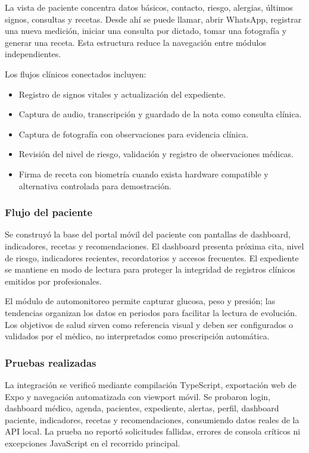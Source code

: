 \documentclass[12pt,letterpaper]{report}
\begin{document}
La vista de paciente concentra datos básicos, contacto, riesgo, alergias, últimos signos, consultas y recetas. Desde ahí se puede llamar, abrir WhatsApp, registrar una nueva medición, iniciar una consulta por dictado, tomar una fotografía y generar una receta. Esta estructura reduce la navegación entre módulos independientes.

Los flujos clínicos conectados incluyen:

\begin{itemize}
  \item Registro de signos vitales y actualización del expediente.
  \item Captura de audio, transcripción y guardado de la nota como consulta clínica.
  \item Captura de fotografía con observaciones para evidencia clínica.
  \item Revisión del nivel de riesgo, validación y registro de observaciones médicas.
  \item Firma de receta con biometría cuando exista hardware compatible y alternativa controlada para demostración.
\end{itemize}

\subsubsection{Flujo del paciente}

Se construyó la base del portal móvil del paciente con pantallas de dashboard, indicadores, recetas y recomendaciones. El dashboard presenta próxima cita, nivel de riesgo, indicadores recientes, recordatorios y accesos frecuentes. El expediente se mantiene en modo de lectura para proteger la integridad de registros clínicos emitidos por profesionales.

El módulo de automonitoreo permite capturar glucosa, peso y presión; las tendencias organizan los datos en periodos para facilitar la lectura de evolución. Los objetivos de salud sirven como referencia visual y deben ser configurados o validados por el médico, no interpretados como prescripción automática.

\subsubsection{Pruebas realizadas}

La integración se verificó mediante compilación TypeScript, exportación web de Expo y navegación automatizada con viewport móvil. Se probaron login, dashboard médico, agenda, pacientes, expediente, alertas, perfil, dashboard paciente, indicadores, recetas y recomendaciones, consumiendo datos reales de la API local. La prueba no reportó solicitudes fallidas, errores de consola críticos ni excepciones JavaScript en el recorrido principal.
\end{document}
